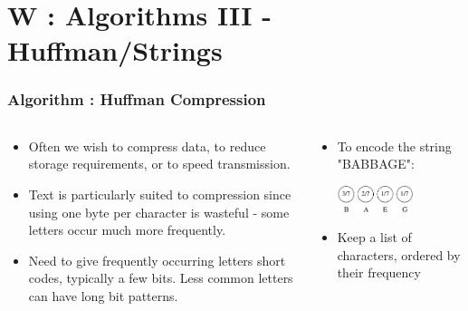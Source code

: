 \section{W : Algorithms III - Huffman/Strings}
\label{chap:algos3}


\begin{frame}[fragile]
\frametitle{Algorithm : Huffman Compression}
\begin{columns}[T]

\begin{column}{0.45\textwidth}
\begin{itemize}[<+->]
\item Often we wish to compress data, to reduce storage requirements, or to speed transmission.
\item  Text is particularly suited to compression since using one byte per character is wasteful - some letters occur much more frequently.
\item  Need to give frequently occurring letters short codes, typically a few bits. Less common letters can have long bit patterns.
\end{itemize}
\end{column}

\begin{column}{0.45\textwidth}
\begin{itemize}[<+->]
\item To encode the string "BABBAGE":

\vspace*{2ex}
\pause
\begin{center}
\includegraphics[width=0.6\textwidth]{../Images/huff1.pdf}
\end{center}
\item Keep a list of characters, ordered by their frequency
\end{itemize}
\end{column}

\end{columns}
\end{frame}


